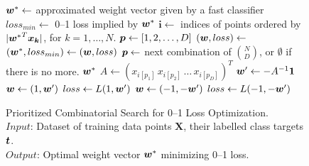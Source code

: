 \begin{figure}
\caption{
Prioritized Combinatorial Search for 0--1 Loss Optimization. \\
\text{\hspace{2.1cm}} $Input$: Dataset of training data points $ \boldsymbol{X}$, their labelled class targets $\boldsymbol{t}$. \\
\text{\hspace{2.1cm}} $Output$: Optimal weight vector $\boldsymbol{w}^*$ minimizing 0--1 loss.
}
\label{alg:cs.prioritized}
\begin{algorithmic}[1]
 
\State $\boldsymbol{w}^* \gets$ approximated weight vector given by a fast classifier
\State $loss_{min} \gets$ 0--1 loss implied by $\boldsymbol{w}^*$
\State $\boldsymbol{i} \gets$ indices of points ordered by $|{\boldsymbol{w}^*}^T\boldsymbol{x_k}|$, for $k=1, \dots, N$.
\State $\boldsymbol{p} \gets [1,2,\dots,D]$
\While{$\p \not= \emptyset$}
   \State $(\boldsymbol{w},loss) \gets$ 
      \State $(\boldsymbol{w}^*, loss_{min}) \gets (\boldsymbol{w}, loss)$
   \EndIf
   \State $\boldsymbol{p} \gets $ next combination of ${N \choose D}$, or $\emptyset$ if there is no more.
\EndWhile
\State \Return $\boldsymbol{w}^*$
\Statex
{} 
   \State $A \gets (x_{i[p_1]} \, x_{i[p_2]} \, \dots \, x_{i[p_D]})^T$
   \State $\boldsymbol{w}' \gets -A^{-1} \boldsymbol{1}$
      \State $\boldsymbol{w} \gets (1, \boldsymbol{w}')$
      \State $loss \gets L(1,\boldsymbol{w}')$
   \Else
      \State $\boldsymbol{w} \gets (-1, -\boldsymbol{w}')$
      \State $loss \gets L(-1,-\boldsymbol{w}')$
   \EndIf
   \State {}
\EndFunction
\Statex
\EndFunction
\end{algorithmic}
\end{figure}

